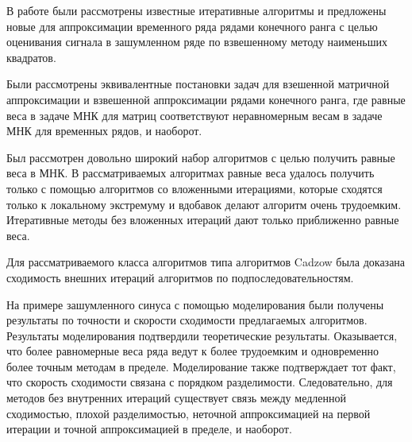 \documentclass[12pt, specialist, subf,href,colorlinks=true,substylefile = spbu.rtx]{disser}
\theoremstyle{remark}
\theoremstyle{definition}
\begin{document}
\conclusion
\label{sec:concl}
В работе были рассмотрены известные итеративные алгоритмы и предложены новые для аппроксимации временного ряда рядами конечного ранга с целью
оценивания сигнала в зашумленном ряде по взвешенному методу наименьших квадратов.

Были рассмотрены эквивалентные постановки задач для взешенной матричной аппроксимации и взвешенной аппроксимации рядами конечного ранга, где равные веса в задаче МНК для матриц соответствуют неравномерным весам в задаче МНК для временных рядов, и наоборот.

Был рассмотрен довольно широкий набор алгоритмов с целью получить равные веса в МНК. В рассматриваемых алгоритмах равные веса удалось
получить только с помощью алгоритмов со вложенными итерациями, которые сходятся только к локальному экстремуму и вдобавок делают алгоритм очень трудоемким.
Итеративные методы без вложенных итераций дают только приближенно равные веса.

Для рассматриваемого класса алгоритмов типа алгоритмов Cadzow была доказана сходимость внешних итераций алгоритмов по подпоследовательностям.

На примере зашумленного синуса с помощью моделирования были получены результаты по точности и скорости сходимости предлагаемых алгоритмов. Результаты моделирования подтвердили теоретические результаты. Оказывается, что более равномерные веса ряда ведут  к более трудоемким и одновременно более точным методам в пределе. Моделирование также подтверждает тот факт, что скорость сходимости связана с порядком разделимости. Следовательно, для методов без внутренних итераций существует связь между медленной сходимостью, плохой разделимостью, неточной аппроксимацией на первой итерации и точной аппроксимацией в пределе, и наоборот.

\end{document}

